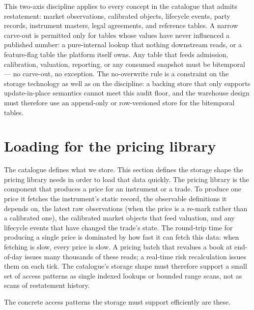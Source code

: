 \documentclass[11pt,a4paper]{article}
\begin{document}
This two-axis discipline applies to every concept in the catalogue that admits restatement: market observations, calibrated objects, lifecycle events, party records, instrument masters, legal agreements, and reference tables. A narrow carve-out is permitted only for tables whose values have never influenced a published number: a pure-internal lookup that nothing downstream reads, or a feature-flag table the platform itself owns. Any table that feeds admission, calibration, valuation, reporting, or any consumed snapshot must be bitemporal --- no carve-out, no exception. The no-overwrite rule is a constraint on the storage technology as well as on the discipline: a backing store that only supports update-in-place semantics cannot meet this audit floor, and the warehouse design must therefore use an append-only or row-versioned store for the bitemporal tables.

\section{Loading for the pricing library}\label{sec:loading}

The catalogue defines what we store. This section defines the storage shape the pricing library needs in order to load that data quickly. The pricing library is the component that produces a price for an instrument or a trade. To produce one price it fetches the instrument's static record, the observable definitions it depends on, the latest raw observations (when the price is a re-mark rather than a calibrated one), the calibrated market objects that feed valuation, and any lifecycle events that have changed the trade's state. The round-trip time for producing a single price is dominated by how fast it can fetch this data: when fetching is slow, every price is slow. A pricing batch that revalues a book at end-of-day issues many thousands of these reads; a real-time risk recalculation issues them on each tick. The catalogue's storage shape must therefore support a small set of access patterns as single indexed lookups or bounded range scans, not as scans of restatement history.

The concrete access patterns the storage must support efficiently are these.
\end{document}
